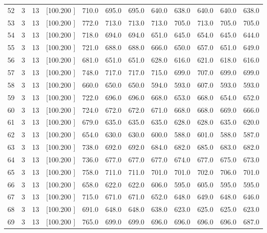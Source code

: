 \documentclass[12pt,a4paper]{article}
\begin{document}
\begin{center}
{\begin{tabular}{r r r r r r r r r r r r}
  52&  3& 13&[100.200   ]&   710.0&   695.0&   695.0&   640.0&   638.0&   640.0&   640.0&   638.0\\[-0.02in]
  53&  3& 13&[100.200   ]&   772.0&   713.0&   713.0&   713.0&   705.0&   713.0&   705.0&   705.0\\[-0.02in]
  54&  3& 13&[100.200   ]&   718.0&   694.0&   694.0&   651.0&   645.0&   654.0&   645.0&   644.0\\[-0.02in]
  55&  3& 13&[100.200   ]&   721.0&   688.0&   688.0&   666.0&   650.0&   657.0&   651.0&   649.0\\[-0.02in]
  56&  3& 13&[100.200   ]&   681.0&   651.0&   651.0&   628.0&   616.0&   621.0&   618.0&   616.0\\[-0.02in]
  57&  3& 13&[100.200   ]&   748.0&   717.0&   717.0&   715.0&   699.0&   707.0&   699.0&   699.0\\[-0.02in]
  58&  3& 13&[100.200   ]&   660.0&   650.0&   650.0&   594.0&   593.0&   607.0&   593.0&   593.0\\[-0.02in]
  59&  3& 13&[100.200   ]&   722.0&   696.0&   696.0&   668.0&   653.0&   668.0&   654.0&   652.0\\[-0.02in]
  60&  3& 13&[100.200   ]&   724.0&   672.0&   672.0&   671.0&   668.0&   668.0&   669.0&   666.0\\[-0.02in]
  61&  3& 13&[100.200   ]&   679.0&   635.0&   635.0&   635.0&   628.0&   628.0&   635.0&   620.0\\[-0.02in]
  62&  3& 13&[100.200   ]&   654.0&   630.0&   630.0&   600.0&   588.0&   601.0&   588.0&   587.0\\[-0.02in]
  63&  3& 13&[100.200   ]&   738.0&   692.0&   692.0&   684.0&   682.0&   685.0&   683.0&   682.0\\[-0.02in]
  64&  3& 13&[100.200   ]&   736.0&   677.0&   677.0&   677.0&   674.0&   677.0&   675.0&   673.0\\[-0.02in]
  65&  3& 13&[100.200   ]&   758.0&   711.0&   711.0&   701.0&   701.0&   702.0&   706.0&   701.0\\[-0.02in]
  66&  3& 13&[100.200   ]&   658.0&   622.0&   622.0&   606.0&   595.0&   605.0&   595.0&   595.0\\[-0.02in]
  67&  3& 13&[100.200   ]&   715.0&   671.0&   671.0&   652.0&   648.0&   649.0&   648.0&   646.0\\[-0.02in]
  68&  3& 13&[100.200   ]&   691.0&   648.0&   648.0&   638.0&   623.0&   625.0&   625.0&   623.0\\[-0.02in]
  69&  3& 13&[100.200   ]&   765.0&   699.0&   699.0&   696.0&   696.0&   696.0&   696.0&   687.0\\[-0.02in]

\end{tabular}}
\end{center}
\end{document}
